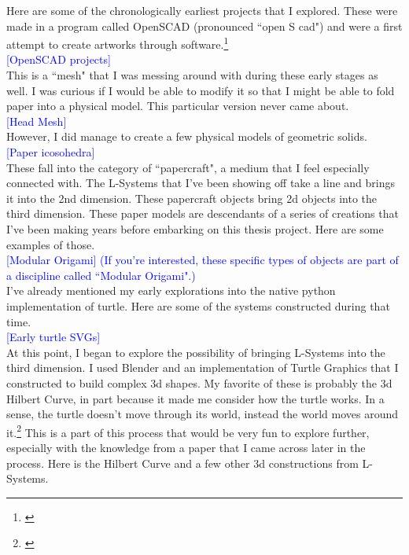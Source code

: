 \documentclass[12pt,twoside]{reedthesis}
\begin{document}
	Here are some of the chronologically earliest projects that I explored. These were made in a program called OpenSCAD (pronounced ``open S cad") and were a first attempt to create artworks through software.\footnote{\cite{openSCAD}}\\
	
	\textcolor{blue}{[OpenSCAD projects]}\\
	
	This is a ``mesh" that I was messing around with during these early stages as well. I was curious if I would be able to modify it so that I might be able to fold paper into a physical model. This particular version never came about.\\
	
	\textcolor{blue}{[Head Mesh]}\\
	
	However, I did manage to create a few physical models of geometric solids.\\
	
	\textcolor{blue}{[Paper icosohedra]}\\
	
	These fall into the category of ``papercraft", a medium that I feel especially connected with. The L-Systems that I've been showing off take a line and brings it into the 2nd dimension. These papercraft objects bring 2d objects into the third dimension. These paper models are descendants of a series of creations that I've been making years before embarking on this thesis project. Here are some examples of those.\\
	
	\textcolor{blue}{[Modular Origami] (If you're interested, these specific types of objects are part of a discipline called ``Modular Origami".)}\\
	
	I've already mentioned my early explorations into the native python implementation of turtle. Here are some of the systems constructed during that time.\\
	
	\textcolor{blue}{[Early turtle SVGs]}\\
	
	At this point, I began to explore the possibility of bringing L-Systems into the third dimension. I used Blender and an implementation of Turtle Graphics that I constructed to build complex 3d shapes. My favorite of these is probably the 3d Hilbert Curve, in part because it made me consider how the turtle works. In a sense, the turtle doesn't move through its world, instead the world moves around it.\footnote{\cite{derose1989}} This is a part of this process that would be very fun to explore further, especially with the knowledge from a paper that I came across later in the process. Here is the Hilbert Curve and a few other 3d constructions from L-Systems.\\
	
\end{document}
